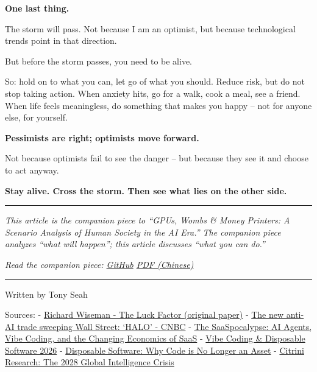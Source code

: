 \textbf{One last thing.}

The storm will pass. Not because I am an optimist, but because
technological trends point in that direction.

But before the storm passes, you need to be alive.

So: hold on to what you can, let go of what you should. Reduce risk, but
do not stop taking action. When anxiety hits, go for a walk, cook a
meal, see a friend. When life feels meaningless, do something that makes
you happy -- not for anyone else, for yourself.

\textbf{Pessimists are right; optimists move forward.}

Not because optimists fail to see the danger -- but because they see it
and choose to act anyway.

\textbf{Stay alive. Cross the storm. Then see what lies on the other
side.}

\begin{center}\rule{0.5\linewidth}{0.5pt}\end{center}

\emph{This article is the companion piece to ``GPUs, Wombs \& Money
Printers: A Scenario Analysis of Human Society in the AI Era.'' The
companion piece analyzes ``what will happen''; this article discusses
``what you can do.''}

\emph{Read the companion piece:
\href{https://github.com/pkusnail/GPUs-Wombs-and-Money-Printers}{GitHub}
\textbar{}
\href{https://github.com/pkusnail/GPUs-Wombs-and-Money-Printers/raw/main/GPU、子宫与印钞机-v1.0.3.pdf}{PDF
(Chinese)}}

\begin{center}\rule{0.5\linewidth}{0.5pt}\end{center}

Written by Tony Seah

Sources: -
\href{http://richardwiseman.com/resources/The_Luck_Factor.pdf}{Richard
Wiseman - The Luck Factor (original paper)} -
\href{https://www.cnbc.com/2026/02/27/the-new-anti-ai-trade-sweeping-wall-street-halo.html}{The
new anti-AI trade sweeping Wall Street: `HALO' - CNBC} -
\href{https://www.thesaascfo.com/the-saaspocalypse-ai-agents-vibe-coding-and-the-changing-economics-of-saas/}{The
SaaSpocalypse: AI Agents, Vibe Coding, and the Changing Economics of
SaaS} -
\href{https://dailyaiworld.com/post/vibe-coding-disposable-software-2026-the-end-of-saas-as-we-know-it}{Vibe
Coding \& Disposable Software 2026} -
\href{https://harrisonaix.com/blog/disposable-software-code-asset/}{Disposable
Software: Why Code is No Longer an Asset} -
\href{https://www.citriniresearch.com/p/2028gic}{Citrini Research: The
2028 Global Intelligence Crisis}
